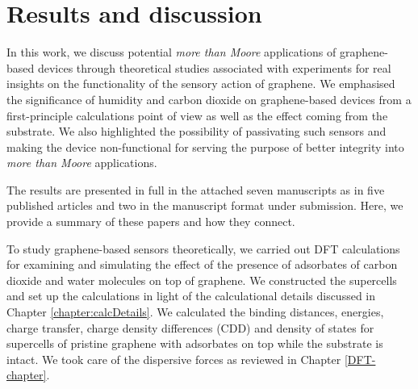 \chapter{Results and discussion}
\label{Results-discussion-chapter}
In this work, we discuss potential \textit{more than Moore} applications of graphene-based devices through theoretical studies associated with experiments for real insights on the functionality of the sensory action of graphene. We emphasised the significance of humidity and carbon dioxide on graphene-based devices from a first-principle calculations point of view as well as the effect coming from the substrate. We also highlighted the possibility of passivating such sensors and making the device non-functional for serving the purpose of better integrity into \textit{more than Moore} applications.  

The results are presented in full in the attached seven manuscripts as in five published articles and two in the manuscript format under submission. Here, we provide a summary of these papers and how they connect.

To study graphene-based sensors theoretically, we carried out DFT calculations for examining and simulating the effect of the presence of adsorbates of carbon dioxide and water molecules on top of graphene. We constructed the supercells and set up the calculations in light of the calculational details discussed in Chapter \ref{chapter:calcDetails}. We calculated the binding distances, energies, charge transfer, charge density differences (CDD) and density of states for supercells of pristine graphene with adsorbates on top while the substrate is intact. We took care of the dispersive forces as reviewed in Chapter \ref{DFT-chapter}. 

